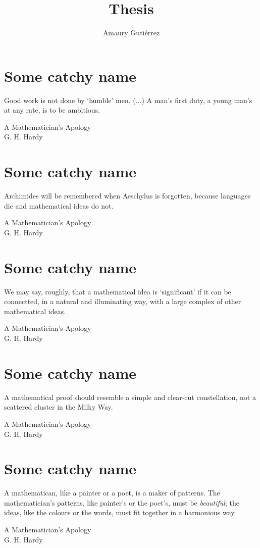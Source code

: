 \documentclass[12pt,letterpaper]{book}
\author{Amaury Guti\'errez}
\title{Thesis}
\theoremstyle{definition} \newtheorem{definition}{Definición}[section]
\theoremstyle{plain} \newtheorem{theorem}{Teorema}[section]
\theoremstyle{plain} \newtheorem{lemma}{Lema}[section]
\theoremstyle{plain} \newtheorem{proposition}[theorem]{Proposici\'on}
\theoremstyle{plain} \newtheorem{corollary}[theorem]{Corolario}
\theoremstyle{plain} \newtheorem{remark}[theorem]{Comentario}
\begin{document}
\frontmatter
 



\tableofcontents

\mainmatter
\chapter{Some catchy name}
\epigraph{Good work is not done by `humble' men. (...) A man's first duty, a young man's at any rate, is to be ambitious.}{A Mathematician's Apology \\ G. H. Hardy}


\chapter{Some catchy name}
\epigraph{Archimides will be remembered when Aeschylus is forgotten, because languages die and mathematical ideas do not.}{A Mathematician's Apology \\ G. H. Hardy}


\chapter{Some catchy name}
\epigraph{We may say, roughly, that a mathematical idea is `significant' if it can be connectted, in a natural and illuminating way, with a large complex of other mathematical ideas.}{A Mathematician's Apology \\ G. H. Hardy}


\chapter{Some catchy name}
\epigraph{A mathematical proof should resemble a simple and clear-cut constellation, not a scattered cluster in the Milky Way.}{A Mathematician's Apology \\ G. H. Hardy}


\chapter{Some catchy name}
\epigraph{A mathematican, like a painter or a poet, is a maker of patterns. The mathematician's patterns, like painter's or the poet's, must be \emph{beautiful}; the ideas, like the colours or the words, must fit together in a harmonious way.}{A Mathematician's Apology \\ G. H. Hardy}

\end{document}
